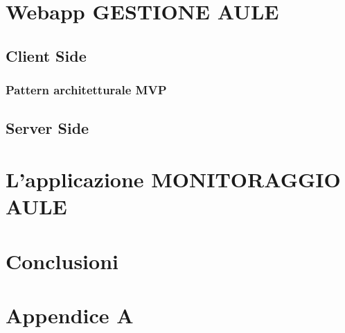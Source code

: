 \documentclass[a4paper,pt11,oneside]{book}
\begin{document}
\chapter{Webapp GESTIONE AULE}

\section{Client Side}

\subsection{Pattern architetturale MVP}



\section{Server Side}


\chapter{L'applicazione MONITORAGGIO AULE}



\chapter{Conclusioni}

\chapter{Appendice A}


\end{document}
